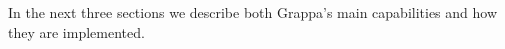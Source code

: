 
In the next three sections we describe both Grappa's main capabilities and how they are implemented.

